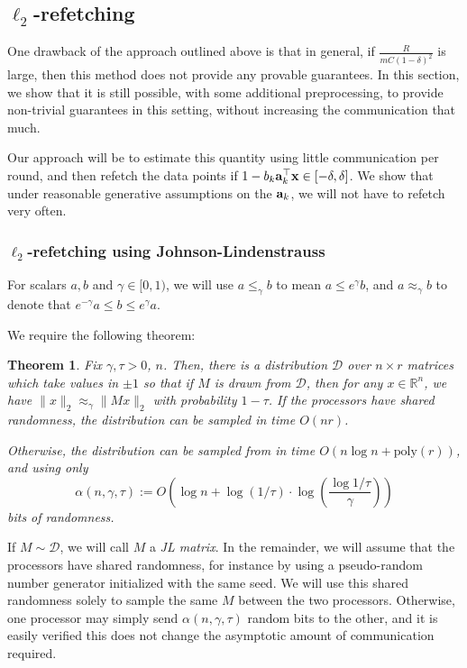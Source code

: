 \documentclass{article}
\newcommand{\R}{\mathbb{R}}
\newcommand{\poly}{\mathrm{poly}}
\def\a{{\bf a}}
\def\x{{\bf x}}
\newtheorem{theorem}{Theorem}
\begin{document}
\subsection{$\ell_2$-refetching}

One drawback of the approach outlined above is that in general, if $\frac{R}{m C (1 - \delta)^2}$ is large, then this method does not provide any provable guarantees.
In this section, we show that it is still possible, with some additional preprocessing, to provide non-trivial guarantees in this setting, without increasing the communication that much.

Our approach will be to estimate this quantity using little communication per round, and then refetch the data points if $1 - b_k \a_k^\top \x \in [-\delta, \delta]$.
We show that under reasonable generative assumptions on the $\a_k$, we will not have to refetch very often.

\subsubsection{$\ell_2$-refetching using Johnson-Lindenstrauss}
For scalars $a, b$ and $\gamma \in [0, 1)$, we will use $a \leq_\gamma b$ to mean $a \leq e^\gamma b$, and $a \approx_\gamma b$ to denote that $e^{-\gamma} a \leq b \leq e^\gamma a$.

We require the following theorem:
\begin{theorem}
\label{thm:JL}
Fix $\gamma, \tau > 0$, $n$.
Then, there is a distribution $\mathcal{D}$ over $n \times r$ matrices which take values in $\pm 1$ so that if $M$  is drawn from $\mathcal{D}$, then for any $x \in \R^n$, we have $\| x \|_2 \approx_\gamma \| M x \|_2$ with probability $1 - \tau$.
If the processors have shared randomness, the distribution can be sampled in time $O(n r)$.

Otherwise, the distribution can be sampled from in time $O(n \log n + \poly (r))$, and using only 
\[
\alpha (n, \gamma, \tau) := O \left( \log n + \log (1 / \tau) \cdot \log \left( \frac{\log 1 / \tau}{\gamma} \right) \right)
\]
bits of randomness.
\end{theorem}
\noindent
If $M \sim \mathcal{D}$, we will call $M$ a \emph{JL matrix}.
In the remainder, we will assume that the processors have shared randomness, for instance by using a pseudo-random number generator initialized with the same seed.
We will use this shared randomness solely to sample the same $M$ between the two processors.
Otherwise, one processor may simply send $\alpha (n, \gamma, \tau)$ random bits to the other, and it is easily verified this does not change the asymptotic amount of communication required.
\end{document}

